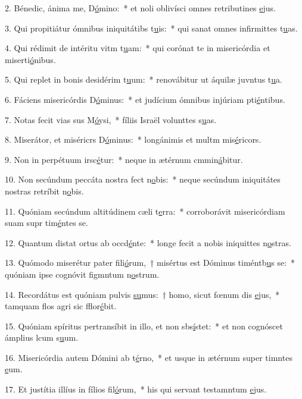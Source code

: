 2. Bénedic, ánima me, D\uline{ó}mino:~* et noli oblivísci omnes retributines \uline{e}jus.\par 
3. Qui propitiátur ómnibus iniquitátibs t\uline{u}is:~* qui sanat omnes infirmittes t\uline{u}as.\par 
4. Qui rédimit de intéritu vitm t\uline{u}am:~* qui corónat te in misericórdia et miserti\uline{ó}nibus.\par 
5. Qui replet in bonis desidérim t\uline{u}um:~* renovábitur ut áquilæ juvntus t\uline{u}a.\par 
6. Fáciens misericórdis D\uline{ó}minus:~* et judícium ómnibus injúriam pti\uline{é}ntibus.\par 
7. Notas fecit vias sus M\uline{ó}ysi,~* fíliis Israël volunttes s\uline{u}as.\par 
8. Miserátor, et miséricrs D\uline{ó}minus:~* longánimis et multm mis\uline{é}ricors.\par 
9. Non in perpétuum irsc\uline{é}tur:~* neque in ætérnum cmmin\uline{á}bitur.\par 
10. Non secúndum peccáta nostra fect n\uline{o}bis:~* neque secúndum iniquitátes nostras retríbit n\uline{o}bis.\par 
11. Quóniam secúndum altitúdinem cæli  t\uline{e}rra:~* corroborávit misericórdiam suam supr tim\uline{é}ntes se.\par 
12. Quantum distat ortus ab occd\uline{é}nte:~* longe fecit a nobis iniquittes n\uline{o}stras.\par 
13. Quómodo miserétur pater fili\uline{ó}rum,~† misértus est Dóminus timéntb\uline{u}s se:~* quóniam ipse cognóvit figmntum n\uline{o}strum.\par 
14. Recordátus est quóniam pulvis \uline{su}mus:~† homo, sicut fœnum dis \uline{e}jus,~* tamquam flos agri sic fflor\uline{é}bit.\par 
15. Quóniam spíritus pertransíbit in illo, et non sbs\uline{í}stet:~* et non cognóscet ámplius lcum s\uline{u}um.\par 
16. Misericórdia autem Dómini ab t\uline{é}rno,~* et usque in ætérnum super timntes \uline{e}um.\par 
17. Et justítia illíus in fílios fil\uline{ó}rum,~* his qui servant testamntum \uline{e}jus.\par 
